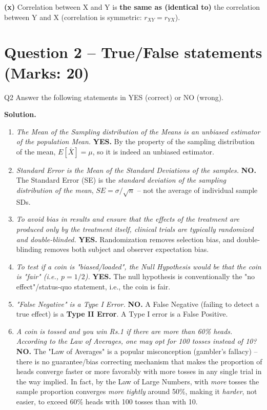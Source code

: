 \documentclass[11pt]{article}
\newcommand{\soln}{\par\noindent\textcolor{acolor}{\textbf{Solution.}}\quad}
\begin{document}
\textbf{(x)} Correlation between X and Y is \textbf{the same as (identical to)} the correlation between Y and X (correlation is symmetric: $r_{XY} = r_{YX}$).

\section{Question 2 -- True/False statements (Marks: 20)}
\begin{question}{Q2}
Answer the following statements in YES (correct) or NO (wrong).
\end{question}

\soln

\begin{enumerate}[label=(\roman*)]

\item \textit{The Mean of the Sampling distribution of the Means is an unbiased estimator of the population Mean.}
\textbf{YES.} By the property of the sampling distribution of the mean, $E[\bar{X}] = \mu$, so it is indeed an unbiased estimator.

\item \textit{Standard Error is the Mean of the Standard Deviations of the samples.}
\textbf{NO.} The Standard Error (SE) is the \emph{standard deviation of the sampling distribution of the mean}, $SE = \sigma/\sqrt{n}$ -- not the average of individual sample SDs.

\item \textit{To avoid bias in results and ensure that the effects of the treatment are produced only by the treatment itself, clinical trials are typically randomized and double-blinded.}
\textbf{YES.} Randomization removes selection bias, and double-blinding removes both subject and observer expectation bias.

\item \textit{To test if a coin is "biased/loaded", the Null Hypothesis would be that the coin is "fair" (i.e., $p=1/2$).}
\textbf{YES.} The null hypothesis is conventionally the "no effect"/status-quo statement, i.e., the coin is fair.

\item \textit{"False Negative" is a Type I Error.}
\textbf{NO.} A False Negative (failing to detect a true effect) is a \textbf{Type II Error}. A Type I error is a False Positive.

\item \textit{A coin is tossed and you win Rs.1 if there are more than 60\% heads. According to the Law of Averages, one may opt for 100 tosses instead of 10?}
\textbf{NO.} The "Law of Averages" is a popular misconception (gambler's fallacy) -- there is no guarantee/bias correcting mechanism that makes the proportion of heads converge faster or more favorably with more tosses in any single trial in the way implied. In fact, by the Law of Large Numbers, with \emph{more} tosses the sample proportion converges \emph{more tightly} around 50\%, making it \emph{harder}, not easier, to exceed 60\% heads with 100 tosses than with 10.


\end{enumerate}
\end{document}
